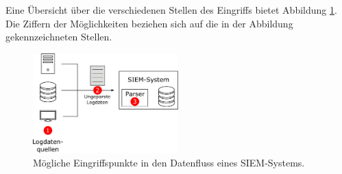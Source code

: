 Eine Übersicht über die verschiedenen Stellen des Eingriffs bietet Abbildung \ref{fig:siem_data_access_point}. Die Ziffern der Möglichkeiten beziehen sich auf die in der Abbildung gekennzeichneten Stellen.

\begin{figure}[]
    \centering
        \includegraphics[width=0.5\textwidth]{dia/siem_data_access_point.pdf}
    \caption{Mögliche Eingriffspunkte in den Datenfluss eines SIEM-Systems.}
    \label{fig:siem_data_access_point}
\end{figure}

